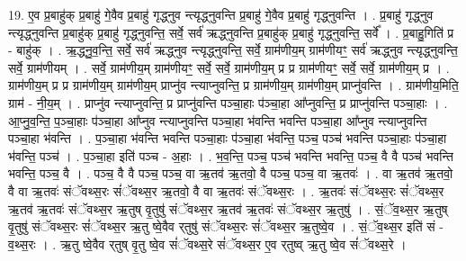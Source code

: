\documentclass[17pt]{extarticle}
\begin{document}
19. ए॒व प्र॒बाहु॑क् प्र॒बाहु॑ गे॒वैव प्र॒बाहु॑ गृद्ध्नुव न्त्यृद्ध्नुवन्ति प्र॒बाहु॑ गे॒वैव प्र॒बाहु॑ गृद्ध्नुवन्ति । . प्र॒बाहु॑ गृद्ध्नुव न्त्यृद्ध्नुवन्ति प्र॒बाहु॑क् प्र॒बाहु॑ गृद्ध्नुवन्ति॒ सर्वे॒ सर्व॑ ऋद्ध्नुवन्ति प्र॒बाहु॑क् प्र॒बाहु॑ गृद्ध्नुवन्ति॒ सर्वे᳚ । . प्र॒बाहु॒गिति॑ प्र - बाहु॑क् । . ऋ॒द्ध्नु॒व॒न्ति॒ सर्वे॒ सर्व॑ ऋद्ध्नुव न्त्यृद्ध्नुवन्ति॒ सर्वे॒ ग्राम॑णीय॒म् ग्राम॑णीयꣳ॒॒ सर्व॑ ऋद्ध्नुव न्त्यृद्ध्नुवन्ति॒ सर्वे॒ ग्राम॑णीयम् । . सर्वे॒ ग्राम॑णीय॒म् ग्राम॑णीयꣳ॒॒ सर्वे॒ सर्वे॒ ग्राम॑णीय॒म् प्र प्र ग्राम॑णीयꣳ॒॒ सर्वे॒ सर्वे॒ ग्राम॑णीय॒म् प्र । . ग्राम॑णीय॒म् प्र प्र ग्राम॑णीय॒म् ग्राम॑णीय॒म् प्राप्नु॑व न्त्याप्नुवन्ति॒ प्र ग्राम॑णीय॒म् ग्राम॑णीय॒म् 
प्राप्नु॑वन्ति । . ग्राम॑णीय॒मिति॒ ग्राम॑ - नी॒य॒म् । . प्राप्नु॑व न्त्याप्नुवन्ति॒ प्र प्राप्नु॑वन्ति पञ्चा॒हाः प॑ञ्चा॒हा आ᳚प्नुवन्ति॒ प्र प्राप्नु॑वन्ति पञ्चा॒हाः । . आ॒प्नु॒व॒न्ति॒ प॒ञ्चा॒हाः प॑ञ्चा॒हा आ᳚प्नुव न्त्याप्नुवन्ति पञ्चा॒हा भ॑वन्ति भवन्ति पञ्चा॒हा आ᳚प्नुव न्त्याप्नुवन्ति पञ्चा॒हा भ॑वन्ति । . प॒ञ्चा॒हा भ॑वन्ति भवन्ति पञ्चा॒हाः प॑ञ्चा॒हा भ॑वन्ति॒ पञ्च॒ पञ्च॑ भवन्ति पञ्चा॒हाः प॑ञ्चा॒हा भ॑वन्ति॒ पञ्च॑ । . प॒ञ्चा॒हा इति॑ पञ्च - अ॒हाः । . भ॒व॒न्ति॒ पञ्च॒ पञ्च॑ भवन्ति भवन्ति॒ पञ्च॒ वै वै पञ्च॑ भवन्ति भवन्ति॒ पञ्च॒ वै । . पञ्च॒ वै वै पञ्च॒ पञ्च॒ वा ऋ॒तव॑ ऋ॒तवो॒ वै पञ्च॒ पञ्च॒ वा ऋ॒तवः॑ । . वा ऋ॒तव॑ ऋ॒तवो॒ वै वा ऋ॒तवः॑ संॅवथ्स॒रः सं॑ॅवथ्स॒र ऋ॒तवो॒ वै वा ऋ॒तवः॑ संॅवथ्स॒रः । . ऋ॒तवः॑ संॅवथ्स॒रः सं॑ॅवथ्स॒र ऋ॒तव॑ ऋ॒तवः॑ संॅवथ्स॒र ऋ॒तुष् वृ॒तुषु॑ संॅवथ्स॒र ऋ॒तव॑ ऋ॒तवः॑ संॅवथ्स॒र ऋ॒तुषु॑ । . सं॒ॅव॒थ्स॒र ऋ॒तुष् वृ॒तुषु॑ संॅवथ्स॒रः सं॑ॅवथ्स॒र ऋ॒तु ष्वे॒वैव र्‌तुषु॑ संॅवथ्स॒रः सं॑ॅवथ्स॒र ऋ॒तुष्वे॒व । . सं॒ॅव॒थ्स॒र इति॑ सं - व॒थ्स॒रः । . ऋ॒तु ष्वे॒वैव र्‌तुष् वृ॒तु ष्वे॒व सं॑ॅवथ्स॒रे सं॑ॅवथ्स॒र ए॒व र्‌तुष्व् ऋ॒तु ष्वे॒व सं॑ॅवथ्स॒रे । \newline
\end{document}
